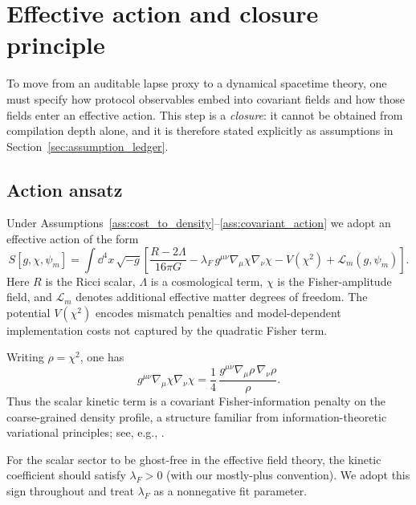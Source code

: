 \section{Effective action and closure principle}
\label{sec:effective_action}

To move from an auditable lapse proxy to a dynamical spacetime theory, one must specify how protocol observables embed into covariant fields and how those fields enter an effective action.
This step is a \emph{closure}: it cannot be obtained from compilation depth alone, and it is therefore stated explicitly as assumptions in Section~\ref{sec:assumption_ledger}.

\subsection{Action ansatz}
\label{subsec:action_ansatz}

Under Assumptions~\ref{ass:cost_to_density}--\ref{ass:covariant_action} we adopt an effective action of the form
\begin{equation}
  S[g,\chi,\psi_m]
  = \int \dd^4x\,\sqrt{-g}\left[
  \frac{R-2\Lambda}{16\pi G}
  - \lambda_F\, g^{\mu\nu}\nabla_\mu\chi\nabla_\nu\chi
  - V(\chi^2)
  + \mathcal{L}_m(g,\psi_m)
  \right].
  \label{eq:omega_action_cap2}
\end{equation}
Here $R$ is the Ricci scalar, $\Lambda$ is a cosmological term, $\chi$ is the Fisher-amplitude field, and $\mathcal{L}_m$ denotes additional effective matter degrees of freedom.
The potential $V(\chi^2)$ encodes mismatch penalties and model-dependent implementation costs not captured by the quadratic Fisher term.

\begin{remark}
\label{rem:fisher_information_relation}
Writing $\rho=\chi^2$, one has
\begin{equation}
  g^{\mu\nu}\nabla_\mu\chi\nabla_\nu\chi
  = \frac{1}{4}\,\frac{g^{\mu\nu}\nabla_\mu\rho\,\nabla_\nu\rho}{\rho}.
\end{equation}
Thus the scalar kinetic term is a covariant Fisher-information penalty on the coarse-grained density profile, a structure familiar from information-theoretic variational principles; see, e.g., \cite{Frieden1998,Reginatto1998}.
\end{remark}

\begin{remark}
\label{rem:lambdaF_sign}
For the scalar sector to be ghost-free in the effective field theory, the kinetic coefficient should satisfy $\lambda_F>0$ (with our mostly-plus convention).
We adopt this sign throughout and treat $\lambda_F$ as a nonnegative fit parameter.
\end{remark}

